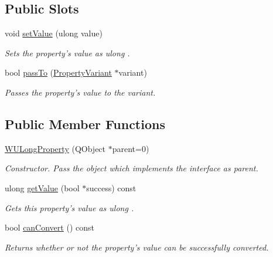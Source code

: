 \subsection*{Public Slots}
\begin{DoxyCompactItemize}
\item 
void \hyperlink{class_w_u_long_property_a9536e4c79e6a9aa6536b6c3e26638bea}{set\-Value} (ulong value)
\begin{DoxyCompactList}\small\item\em Sets the property's value as ulong . \end{DoxyCompactList}\item 
bool \hyperlink{class_w_u_long_property_a0af680a7f27dd608c0ae17a49a8cfc6e}{pass\-To} (\hyperlink{class_property_variant}{Property\-Variant} $\ast$variant)
\begin{DoxyCompactList}\small\item\em Passes the property's value to the variant. \end{DoxyCompactList}\end{DoxyCompactItemize}
\subsection*{Public Member Functions}
\begin{DoxyCompactItemize}
\item 
\hyperlink{class_w_u_long_property_ab2e17ffa240a20e21098ad95ba202260}{W\-U\-Long\-Property} (Q\-Object $\ast$parent=0)
\begin{DoxyCompactList}\small\item\em Constructor. Pass the object which implements the interface as parent. \end{DoxyCompactList}\item 
ulong \hyperlink{class_w_u_long_property_a58823102ac77872b7700b0e4347cac28}{get\-Value} (bool $\ast$success) const 
\begin{DoxyCompactList}\small\item\em Gets this property's value as ulong . \end{DoxyCompactList}\item 
bool \hyperlink{class_w_u_long_property_add1989192edb81ac284a6680cf9f32dd}{can\-Convert} () const 
\begin{DoxyCompactList}\small\item\em Returns whether or not the property's value can be successfully converted. \end{DoxyCompactList}\end{DoxyCompactItemize}
